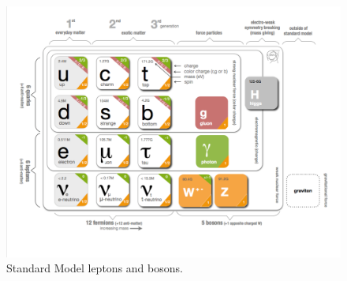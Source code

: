 




\begin{figure}
  \includegraphics[width=\hugefigwidth]{chap_SMAndQGP_figures/Standard_model_infographic}
  \caption[Standard Model leptons and bosons]%
  {Standard Model leptons and bosons.}
  \label{fig:SM}
\end{figure}




